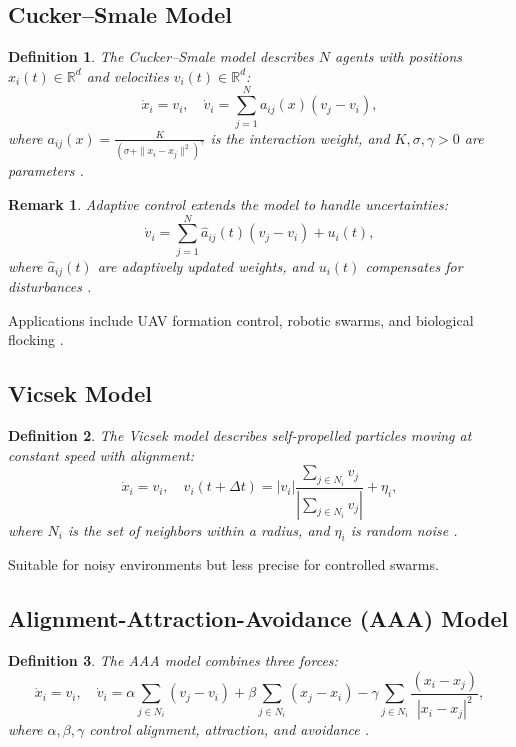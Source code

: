 \documentclass{article}
\theoremstyle{plain}
\newtheorem{definition}{Definition}[section]
\newtheorem{remark}{Remark}[section]
\begin{document}
\subsection{Cucker--Smale Model}
\begin{definition}
The \emph{Cucker--Smale model} describes \(N\) agents with positions \(x_i(t) \in \mathbb{R}^d\) and velocities \(v_i(t) \in \mathbb{R}^d\):
\[
\dot{x}_i = v_i, \quad \dot{v}_i = \sum_{j=1}^N a_{ij}(x) (v_j - v_i),
\]
where \(a_{ij}(x) = \frac{K}{(\sigma + \|x_i - x_j\|^2)^\gamma}\) is the interaction weight, and \(K, \sigma, \gamma > 0\) are parameters \cite{cucker_smale}.
\end{definition}

\begin{remark}
Adaptive control extends the model to handle uncertainties:
\[
\dot{v}_i = \sum_{j=1}^N \hat{a}_{ij}(t) (v_j - v_i) + u_i(t),
\]
where \(\hat{a}_{ij}(t)\) are adaptively updated weights, and \(u_i(t)\) compensates for disturbances \cite{adaptive_swarm}.
\end{remark}

Applications include UAV formation control, robotic swarms, and biological flocking \cite{uav_swarm}.

\subsection{Vicsek Model}
\begin{definition}
The \emph{Vicsek model} describes self-propelled particles moving at constant speed with alignment:
\[
\dot{x}_i = v_i, \quad v_i(t + \Delta t) = |v_i| \frac{\sum_{j \in N_i} v_j}{|\sum_{j \in N_i} v_j|} + \eta_i,
\]
where \(N_i\) is the set of neighbors within a radius, and \(\eta_i\) is random noise \cite{vicsek_model}.
\end{definition}

Suitable for noisy environments but less precise for controlled swarms.

\subsection{Alignment-Attraction-Avoidance (AAA) Model}
\begin{definition}
The \emph{AAA model} combines three forces:
\[
\dot{x}_i = v_i, \quad \dot{v}_i = \alpha \sum_{j \in N_i} (v_j - v_i) + \beta \sum_{j \in N_i} (x_j - x_i) - \gamma \sum_{j \in N_i} \frac{(x_i - x_j)}{|x_i - x_j|^2},
\]
where \(\alpha, \beta, \gamma\) control alignment, attraction, and avoidance \cite{aaa_model}.
\end{definition}
\end{document}
